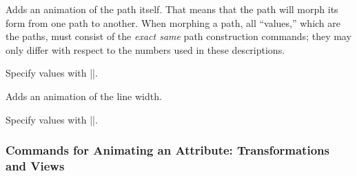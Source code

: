 \begin{command}{\pgfsys@animatepath}
  Adds an animation of the path itself. That means that the path will
  morph its form from one path to another. When morphing a path, all
  ``values,'' which are the paths, must consist of the  \emph{exact
    same} path construction commands; they may only differ with
  respect to the numbers used in these descriptions.
  
  Specify values with |\pgfsys@animation@path|.
\begin{codeexample}[width=2.3cm]
\end{codeexample}
\end{command}

\begin{command}{\pgfsys@animatelinewidth}
  Adds an animation of the line width.
  
  Specify values with |\pgfsys@animation@dimension|.
\begin{codeexample}[width=2cm]
\end{codeexample}
\end{command}


\subsubsection{Commands for Animating an Attribute: Transformations  and Views}

